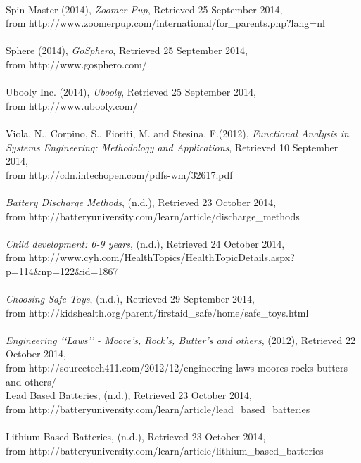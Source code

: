\documentclass[11pt,twoside,a4paper]{report}
\begin{document}
\\
Spin Master (2014), \textit{Zoomer Pup}, Retrieved 25 September 2014, \\from http://www.zoomerpup.com/international/for\_parents.php?lang=nl\\
\\
Sphere (2014), \textit{GoSphero}, Retrieved 25 September 2014,\\ from http://www.gosphero.com/ \\
\\
Ubooly Inc. (2014), \textit{Ubooly}, Retrieved 25 September 2014,\\ from http://www.ubooly.com/ \\
\\
Viola, N., Corpino, S., Fioriti, M. and Stesina. F.(2012), \textit{Functional Analysis in Systems Engineering: Methodology and Applications}, Retrieved 10 September 2014, \\from http://cdn.intechopen.com/pdfs-wm/32617.pdf \\
\\
\textit{Battery Discharge Methods}, (n.d.), Retrieved 23 October 2014, \\from http://batteryuniversity.com/learn/article/discharge\_methods\\
\\
\textit{Child development: 6-9 years}, (n.d.), Retrieved 24 October 2014, \\from http://www.cyh.com/HealthTopics/HealthTopicDetails.aspx?p=114\&np=122\&id=1867\\
\\
\textit{Choosing Safe Toys}, (n.d.), Retrieved 29 September 2014, \\from http://kidshealth.org/parent/firstaid\_safe/home/safe\_toys.html \\
\\
\textit{Engineering \lq\lq{}Laws\rq\rq{} - Moore\rq{}s, Rock\rq{}s, Butter\rq{}s and others}, (2012), Retrieved 22 October 2014, \\from http://sourcetech411.com/2012/12/engineering-laws-moores-rocks-butters-and-others/ \\
Lead Based Batteries, (n.d.), Retrieved 23 October 2014, \\from http://batteryuniversity.com/learn/article/lead\_based\_batteries \\
\\
Lithium Based Batteries, (n.d.), Retrieved 23 October 2014, \\from http://batteryuniversity.com/learn/article/lithium\_based\_batteries \\
\end{document}
